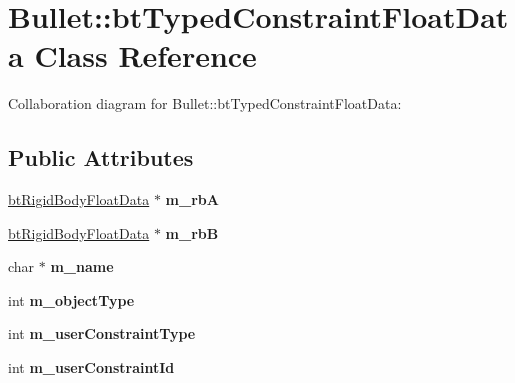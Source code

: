 \hypertarget{class_bullet_1_1bt_typed_constraint_float_data}{\section{Bullet\+:\+:bt\+Typed\+Constraint\+Float\+Data Class Reference}
\label{class_bullet_1_1bt_typed_constraint_float_data}
}


Collaboration diagram for Bullet\+:\+:bt\+Typed\+Constraint\+Float\+Data\+:
\subsection*{Public Attributes}
\begin{DoxyCompactItemize}
\item 
\hypertarget{class_bullet_1_1bt_typed_constraint_float_data_a968d52a35a48a89cff6d4de9d36711a5}{\hyperlink{class_bullet_1_1bt_rigid_body_float_data}{bt\+Rigid\+Body\+Float\+Data} $\ast$ {\bfseries m\+\_\+rb\+A}}\label{class_bullet_1_1bt_typed_constraint_float_data_a968d52a35a48a89cff6d4de9d36711a5}

\item 
\hypertarget{class_bullet_1_1bt_typed_constraint_float_data_a64590c0308b8709da4c3a7aee2d7628d}{\hyperlink{class_bullet_1_1bt_rigid_body_float_data}{bt\+Rigid\+Body\+Float\+Data} $\ast$ {\bfseries m\+\_\+rb\+B}}\label{class_bullet_1_1bt_typed_constraint_float_data_a64590c0308b8709da4c3a7aee2d7628d}

\item 
\hypertarget{class_bullet_1_1bt_typed_constraint_float_data_a99da2aae082585aa9aa1372249c67dce}{char $\ast$ {\bfseries m\+\_\+name}}\label{class_bullet_1_1bt_typed_constraint_float_data_a99da2aae082585aa9aa1372249c67dce}

\item 
\hypertarget{class_bullet_1_1bt_typed_constraint_float_data_a37f0ee98ec1e3eb813e885be7ebcc4a0}{int {\bfseries m\+\_\+object\+Type}}\label{class_bullet_1_1bt_typed_constraint_float_data_a37f0ee98ec1e3eb813e885be7ebcc4a0}

\item 
\hypertarget{class_bullet_1_1bt_typed_constraint_float_data_a9a4dd44e4d275d36e31013c6a79ce5ec}{int {\bfseries m\+\_\+user\+Constraint\+Type}}\label{class_bullet_1_1bt_typed_constraint_float_data_a9a4dd44e4d275d36e31013c6a79ce5ec}

\item 
\hypertarget{class_bullet_1_1bt_typed_constraint_float_data_a24d58a165a246c5fb7380e8928adf25c}{int {\bfseries m\+\_\+user\+Constraint\+Id}}\label{class_bullet_1_1bt_typed_constraint_float_data_a24d58a165a246c5fb7380e8928adf25c}


\end{DoxyCompactItemize}
